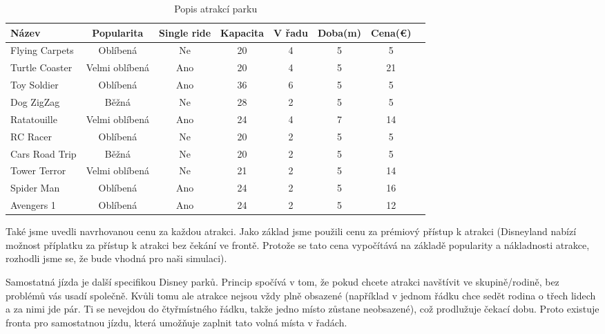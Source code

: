 \documentclass[a4paper,12pt]{article}
\begin{document}
\begin{table}[h!]
	\centering
	\begin{tabular}{|l|c|c|c|c|c|c|c|}
		\hline
		\textbf{Název} &\textbf{Popularita}&\textbf{Single ride}&\textbf{Kapacita}&\textbf{V řadu}&\textbf{Doba(m)}&\textbf{Cena(€)}\\ \hline
		Flying Carpets        & Oblíbená         & Ne               & 20               & 4            & 5         & 5        \\ \hline
		Turtle Coaster        & Velmi oblíbená   & Ano              & 20               & 4            & 5         & 21       \\ \hline
		Toy Soldier           & Oblíbená         & Ano              & 36               & 6            & 5         & 5        \\ \hline
		Dog ZigZag            & Běžná            & Ne               & 28               & 2            & 5         & 5        \\ \hline
		Ratatouille           & Velmi oblíbená   & Ano              & 24               & 4            & 7         & 14       \\ \hline
		RC Racer              & Oblíbená         & Ne               & 20               & 2            & 5         & 5        \\ \hline
		Cars Road Trip        & Běžná            & Ne               & 20               & 2            & 5         & 5        \\ \hline
		Tower Terror          & Velmi oblíbená   & Ne               & 21               & 2            & 5         & 14       \\ \hline
		Spider Man            & Oblíbená         & Ano              & 24               & 2            & 5         & 16       \\ \hline
		Avengers 1            & Oblíbená         & Ano              & 24               & 2            & 5         & 12       \\ \hline
	\end{tabular}
	\caption{Popis atrakcí parku}
	\label{tab:attractions}
\end{table}

Také jsme uvedli navrhovanou cenu za každou atrakci. Jako základ jsme použili cenu za prémiový přístup k atrakci (Disneyland nabízí možnost příplatku za přístup k atrakci bez čekání ve frontě. Protože se tato cena vypočítává na základě popularity a nákladnosti atrakce, rozhodli jsme se, že bude vhodná pro naši simulaci).

Samostatná jízda je další specifikou Disney parků. Princip spočívá v tom, že pokud chcete atrakci navštívit ve skupině/rodině, bez problémů vás usadí společně. Kvůli tomu ale atrakce nejsou vždy plně obsazené (například v jednom řádku chce sedět rodina o třech lidech a za nimi jde pár. Ti se nevejdou do čtyřmístného řádku, takže jedno místo zůstane neobsazené), což prodlužuje čekací dobu. Proto existuje fronta pro samostatnou jízdu, která umožňuje zaplnit tato volná místa v řadách.
\end{document}
